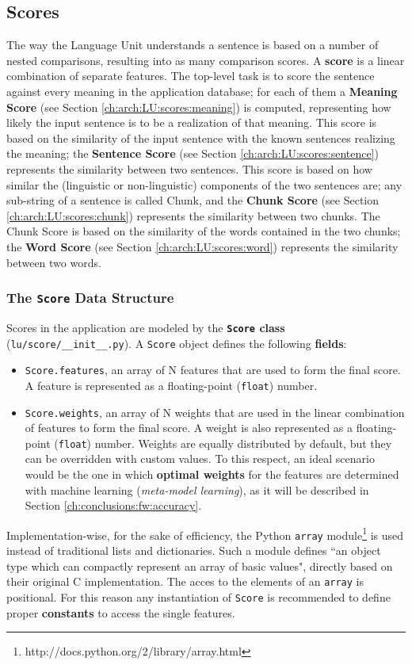 \subsection{Scores} \label{ch:arch:LU:scores}
The way the Language Unit understands a sentence is based on a number of nested comparisons, resulting into as many comparison scores. A \textbf{score} is a linear combination of separate features. The top-level task is to score the sentence against every meaning in the application database; for each of them a \textbf{Meaning Score} (see Section \ref{ch:arch:LU:scores:meaning}) is computed, representing how likely the input sentence is to be a realization of that meaning. This score is based on the similarity of the input sentence with the known sentences realizing the meaning; the \textbf{Sentence Score} (see Section \ref{ch:arch:LU:scores:sentence}) represents the similarity between two sentences. This score is based on how similar the (linguistic or non-linguistic) components of the two sentences are; any sub-string of a sentence is called Chunk, and the \textbf{Chunk Score} (see Section \ref{ch:arch:LU:scores:chunk}) represents the similarity between two chunks. The Chunk Score is based on the similarity of the words contained in the two chunks; the \textbf{Word Score} (see Section \ref{ch:arch:LU:scores:word}) represents the similarity between two words.

\subsubsection{The \texttt{Score} Data Structure}
Scores in the application are modeled by the \textbf{\texttt{Score} class} (\texttt{lu/score/\_\_init\_\_.py}). A \texttt{Score} object defines the following \textbf{fields}:
\begin{itemize}
	\item \texttt{Score.features}, an array of N features that are used to form the final score. A feature is represented as a floating-point (\texttt{float}) number.
	\item \texttt{Score.weights}, an array of N weights that are used in the linear combination of features to form the final score. A weight is also represented as a floating-point (\texttt{float}) number. Weights are equally distributed by default, but they can be overridden with custom values. To this respect, an ideal scenario would be the one in which \textbf{optimal weights} for the features are determined with machine learning (\emph{meta-model learning}), as it will be described in Section \ref{ch:conclusions:fw:accuracy}.
\end{itemize}
Implementation-wise, for the sake of efficiency, the Python \texttt{array} module\footnote{http://docs.python.org/2/library/array.html} is used instead of traditional lists and dictionaries. Such a module defines ``an object type which can compactly represent an array of basic values", directly based on their original C implementation. The acces to the elements of an \texttt{array} is positional. For this reason any instantiation of \texttt{Score} is recommended to define proper \textbf{constants} to access the single features.

